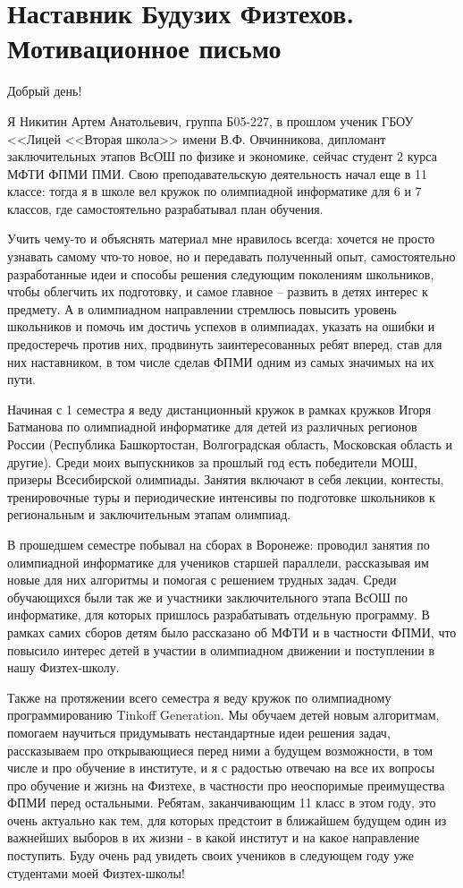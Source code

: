 \section{\textbf{Наставник Будузих Физтехов. Мотивационное письмо}}
\smallskip

\quad Добрый день!
\smallskip

\quad Я Никитин Артем Анатольевич, группа Б05-227, в прошлом ученик ГБОУ <<Лицей <<Вторая школа>> имени В.Ф. Овчинникова, дипломант 
заключительных этапов ВсОШ по физике и экономике, сейчас студент 2 курса МФТИ ФПМИ ПМИ. Свою преподавательскую деятельность начал еще в 11 
классе: тогда я в школе вел кружок по олимпиадной информатике для 6 и 7 классов, где самостоятельно разрабатывал план обучения.

\quad Учить чему-то и объяснять материал мне нравилось всегда: хочется не просто узнавать самому что-то новое, но и передавать полученный опыт, 
самостоятельно разработанные идеи и способы решения следующим поколениям школьников, чтобы облегчить их подготовку, и самое главное – развить в 
детях интерес к предмету. А в олимпиадном направлении стремлюсь повысить уровень школьников и помочь им достичь успехов в олимпиадах, указать 
на ошибки и предостеречь против них, продвинуть заинтересованных ребят вперед, став для них наставником, в том числе сделав ФПМИ одним из самых 
значимых на их пути.

\quad Начиная с 1 семестра я веду дистанционный кружок в рамках кружков Игоря Батманова по олимпиадной информатике для детей из различных 
регионов России (Республика Башкортостан, Волгоградская область, Московская область и другие). Среди моих выпускников за прошлый год есть 
победители МОШ, призеры Всесибирской олимпиады. Занятия включают в себя лекции, контесты, тренировочные туры и периодические интенсивы по 
подготовке школьников к региональным и заключительным этапам олимпиад.

\quad В прошедшем семестре побывал на сборах в Воронеже: проводил занятия по олимпиадной информатике для учеников старшей параллели, 
рассказывая им новые для них алгоритмы и помогая с решением трудных задач. Среди обучающихся были так же и участники заключительного этапа 
ВсОШ по информатике, для которых пришлось разрабатывать отдельную программу. В рамках самих сборов детям было рассказано об МФТИ и в частности 
ФПМИ, что повысило интерес детей в участии в олимпиадном движении и поступлении в нашу Физтех-школу.

\quad Также на протяжении всего семестра я веду кружок по олимпиадному программированию Tinkoff Generation. Мы обучаем детей новым алгоритмам, 
помогаем научиться придумывать нестандартные идеи решения задач, рассказываем про открывающиеся перед ними а будущем возможности, в том числе 
и про обучение в институте, и я с радостью отвечаю на все их вопросы про обучение и жизнь на Физтехе, в частности про неоспоримые преимущества 
ФПМИ перед остальными. Ребятам, заканчивающим 11 класс в этом году, это очень актуально как тем, для которых предстоит в ближайшем будущем один 
из важнейших выборов в их жизни ‐ в какой институт и на какое направление поступить. Буду очень рад увидеть своих учеников в следующем году уже 
студентами моей Физтех-школы!

